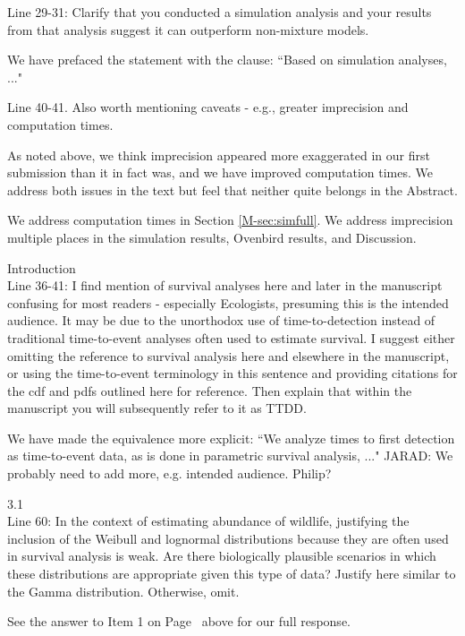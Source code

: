 \documentclass[12pt]{article}
\renewenvironment{quote}  %
              {\list{}{\rightmargin\leftmargin}\normalfont%
               \item\relax}
              {\endlist}
\newcommand{\jarad}[1]{{\color{Orange} JARAD: #1}}
\begin{document}
Line 29-31: Clarify that you conducted a simulation analysis and your results from that analysis suggest it can outperform non-mixture models.
\begin{quote}
We have prefaced the statement with the clause: ``Based on simulation analyses, ..."
\end{quote}

Line 40-41.  Also worth mentioning caveats - e.g., greater imprecision and computation times.
\begin{quote}

As noted above, we think imprecision appeared more exaggerated in our first submission than it in fact was, and we have improved computation times.
We address both issues in the text but feel that neither quite belongs in the Abstract.

We address computation times in Section \ref{M-sec:simfull}.
We address imprecision multiple places in the simulation results, Ovenbird results, and Discussion.
\end{quote}

Introduction\\
Line 36-41: I find mention of survival analyses here and later in the manuscript confusing for most readers - especially Ecologists, presuming this is the intended audience.  It may be due to the unorthodox use of time-to-detection instead of traditional time-to-event analyses often used to estimate survival.  I suggest either omitting the reference to survival analysis here and elsewhere in the manuscript, or using the time-to-event terminology in this sentence and providing citations for the cdf and pdfs outlined here for reference.  Then explain that within the manuscript you will subsequently refer to it as TTDD.  
\begin{quote}
We have made the equivalence more explicit: ``We analyze times to first detection as time-to-event data, as is done in parametric survival analysis, ..."
\jarad{We probably need to add more, e.g. intended audience. Philip?} 
\end{quote}

3.1 \\
Line 60: In the context of estimating abundance of wildlife, justifying the inclusion of the Weibull and lognormal distributions because they are often used in survival analysis is weak.  Are there biologically plausible scenarios in which these distributions are appropriate given this type of data?  Justify here similar to the Gamma distribution.  Otherwise, omit.
\begin{quote}
See the answer to Item 1 on Page~\pageref{ans:one} above for our full response.
\end{quote}
\end{document}
